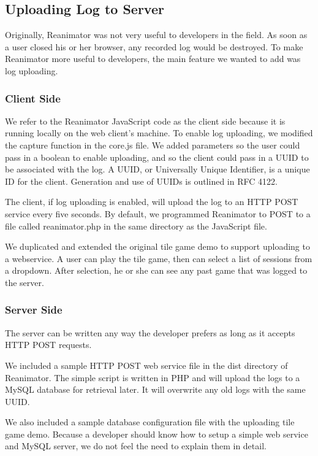 \documentclass[12pt,journal]{IEEEtran}
\begin{document}
\subsection{Uploading Log to Server}
Originally, Reanimator was not very useful to developers in the field. As soon as a user closed his or her browser, any recorded log would be destroyed. To make Reanimator more useful to developers, the main feature we wanted to add was log uploading.

\subsubsection{Client Side}
We refer to the Reanimator JavaScript code as the client side because it is running locally on the web client’s machine. To enable log uploading, we modified the capture function in the core.js file. We added parameters so the user could pass in a boolean to enable uploading, and so the client could pass in a UUID to be associated with the log. A UUID, or Universally Unique Identifier, is a unique ID for the client. Generation and use of UUIDs is outlined in RFC 4122. \cite{p.leachm.meallingr.salz2005}
\par
The client, if log uploading is enabled, will upload the log to an HTTP POST service every five seconds. By default, we programmed Reanimator to POST to a file called reanimator.php in the same directory as the JavaScript file.
\par
We duplicated and extended the original tile game demo to support uploading to a webservice. A user can play the tile game, then can select a list of sessions from a dropdown. After selection, he or she can see any past game that was logged to the server.

\subsubsection{Server Side}
The server can be written any way the developer prefers as long as it accepts HTTP POST requests.
\par
We included a sample HTTP POST web service file in the dist directory of Reanimator. The simple script is written in PHP and will upload the logs to a MySQL database for retrieval later. It will overwrite any old logs with the same UUID.
\par
We also included a sample database configuration file with the uploading tile game demo. Because a developer should know how to setup a simple web service and MySQL server, we do not feel the need to explain them in detail.
\end{document}
